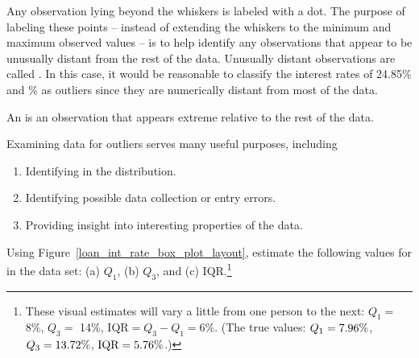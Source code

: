 Any observation lying beyond the whiskers is labeled with a dot.
The purpose of labeling these points --
instead of extending the whiskers to the minimum
and maximum observed values --
is to help identify any observations that appear to be
unusually distant from the rest of the data.
Unusually distant observations are called
.
In this case, it would be reasonable to classify the
interest rates of 24.85\% and \loanLargestValue{}\%
as outliers since they are numerically distant from
most of the data.

\begin{termBox}{
  An  is an observation that appears
  extreme relative to the rest of the data. \vspace{3mm}
  
  Examining data for outliers serves
  many useful purposes, including\vspace{-1mm}
  \begin{enumerate}
  \setlength{\itemsep}{0mm}
  \item Identifying
      in the distribution.
  \item Identifying possible data collection or entry
      errors.
  \item Providing insight into interesting properties
      of the data.\vspace{-1mm}
  \end{enumerate}}
\end{termBox}


\begin{exercise}
Using Figure~\ref{loan_int_rate_box_plot_layout},
estimate the following values for
 in the
 data set:
(a) $Q_1$,
(b) $Q_3$, and
(c) IQR.\footnote{These
  visual estimates will vary a little from one person
  to the next:
  $Q_1=$ 8\%,
  $Q_3=$ 14\%,
  $\text{IQR} = Q_3 - Q_1 = 6\%$.
  (The true values: $Q_1= 7.96{}\%$, $Q_3 = 13.72{}\%$,
  $\text{IQR} = 5.76{}\%$.)}
\end{exercise}

